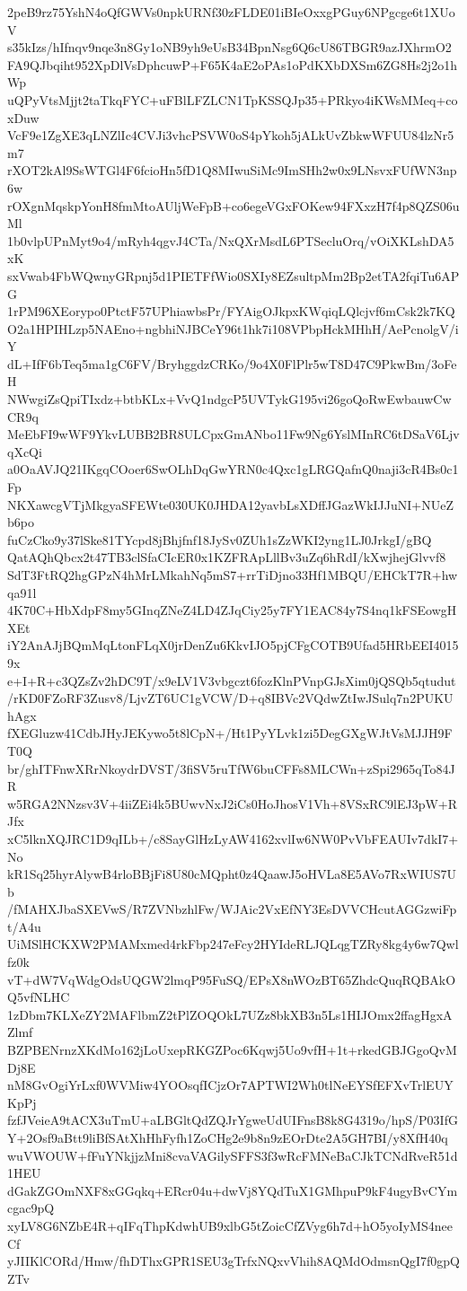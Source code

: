 2peB9rz75YshN4oQfGWVs0npkURNf30zFLDE01iBIeOxxgPGuy6NPgcge6t1XUoV
s35kIzs/hIfnqv9nqe3n8Gy1oNB9yh9eUsB34BpnNsg6Q6cU86TBGR9azJXhrmO2
FA9QJbqiht952XpDlVsDphcuwP+F65K4aE2oPAs1oPdKXbDXSm6ZG8Hs2j2o1hWp
uQPyVtsMjjt2taTkqFYC+uFBlLFZLCN1TpKSSQJp35+PRkyo4iKWsMMeq+coxDuw
VcF9e1ZgXE3qLNZlIc4CVJi3vhcPSVW0oS4pYkoh5jALkUvZbkwWFUU84lzNr5m7
rXOT2kAl9SsWTGl4F6fcioHn5fD1Q8MIwuSiMc9ImSHh2w0x9LNsvxFUfWN3np6w
rOXgnMqskpYonH8fmMtoAUljWeFpB+co6egeVGxFOKew94FXxzH7f4p8QZS06uMl
1b0vlpUPnMyt9o4/mRyh4qgvJ4CTa/NxQXrMsdL6PTSecluOrq/vOiXKLshDA5xK
sxVwab4FbWQwnyGRpnj5d1PIETFfWio0SXIy8EZsultpMm2Bp2etTA2fqiTu6APG
1rPM96XEorypo0PtctF57UPhiawbsPr/FYAigOJkpxKWqiqLQlcjvf6mCsk2k7KQ
O2a1HPIHLzp5NAEno+ngbhiNJBCeY96t1hk7i108VPbpHckMHhH/AePcnolgV/iY
dL+IfF6bTeq5ma1gC6FV/BryhggdzCRKo/9o4X0FlPlr5wT8D47C9PkwBm/3oFeH
NWwgiZsQpiTIxdz+btbKLx+VvQ1ndgcP5UVTykG195vi26goQoRwEwbauwCwCR9q
MeEbFI9wWF9YkvLUBB2BR8ULCpxGmANbo11Fw9Ng6YslMInRC6tDSaV6LjvqXcQi
a0OaAVJQ21IKgqCOoer6SwOLhDqGwYRN0c4Qxc1gLRGQafnQ0naji3cR4Bs0c1Fp
NKXawcgVTjMkgyaSFEWte030UK0JHDA12yavbLsXDffJGazWkIJJuNI+NUeZb6po
fuCzCko9y37lSke81TYcpd8jBhjfnf18JySv0ZUh1sZzWKI2yng1LJ0JrkgI/gBQ
QatAQhQbcx2t47TB3clSfaCIcER0x1KZFRApLllBv3uZq6hRdI/kXwjhejGlvvf8
SdT3FtRQ2hgGPzN4hMrLMkahNq5mS7+rrTiDjno33Hf1MBQU/EHCkT7R+hwqa91l
4K70C+HbXdpF8my5GInqZNeZ4LD4ZJqCiy25y7FY1EAC84y7S4nq1kFSEowgHXEt
iY2AnAJjBQmMqLtonFLqX0jrDenZu6KkvIJO5pjCFgCOTB9Ufad5HRbEEI40159x
e+I+R+c3QZsZv2hDC9T/x9eLV1V3vbgczt6fozKlnPVnpGJsXim0jQSQb5qtudut
/rKD0FZoRF3Zusv8/LjvZT6UC1gVCW/D+q8IBVc2VQdwZtIwJSulq7n2PUKUhAgx
fXEGluzw41CdbJHyJEKywo5t8lCpN+/Ht1PyYLvk1zi5DegGXgWJtVsMJJH9FT0Q
br/ghITFnwXRrNkoydrDVST/3fiSV5ruTfW6buCFFs8MLCWn+zSpi2965qTo84JR
w5RGA2NNzsv3V+4iiZEi4k5BUwvNxJ2iCs0HoJhosV1Vh+8VSxRC9lEJ3pW+RJfx
xC5lknXQJRC1D9qILb+/c8SayGlHzLyAW4162xvlIw6NW0PvVbFEAUIv7dkI7+No
kR1Sq25hyrAlywB4rloBBjFi8U80cMQpht0z4QaawJ5oHVLa8E5AVo7RxWIUS7Ub
/fMAHXJbaSXEVwS/R7ZVNbzhlFw/WJAic2VxEfNY3EsDVVCHcutAGGzwiFpt/A4u
UiMSlHCKXW2PMAMxmed4rkFbp247eFcy2HYIdeRLJQLqgTZRy8kg4y6w7Qwlfz0k
vT+dW7VqWdgOdsUQGW2lmqP95FuSQ/EPsX8nWOzBT65ZhdcQuqRQBAkOQ5vfNLHC
1zDbm7KLXeZY2MAFlbmZ2tPlZOQOkL7UZz8bkXB3n5Ls1HIJOmx2ffagHgxAZlmf
BZPBENrnzXKdMo162jLoUxepRKGZPoc6Kqwj5Uo9vfH+1t+rkedGBJGgoQvMDj8E
nM8GvOgiYrLxf0WVMiw4YOOsqfICjzOr7APTWI2Wh0tlNeEYSfEFXvTrlEUYKpPj
fzfJVeieA9tACX3uTmU+aLBGltQdZQJrYgweUdUIFnsB8k8G4319o/hpS/P03IfG
Y+2Osf9aBtt9liBfSAtXhHhFyfh1ZoCHg2e9b8n9zEOrDte2A5GH7BI/y8XfH40q
wuVWOUW+fFuYNkjjzMni8cvaVAGilySFFS3f3wRcFMNeBaCJkTCNdRveR51d1HEU
dGakZGOmNXF8xGGqkq+ERcr04u+dwVj8YQdTuX1GMhpuP9kF4ugyBvCYmcgac9pQ
xyLV8G6NZbE4R+qIFqThpKdwhUB9xlbG5tZoicCfZVyg6h7d+hO5yoIyMS4neeCf
yJIIKlCORd/Hmw/fhDThxGPR1SEU3gTrfxNQxvVhih8AQMdOdmsnQgI7f0gpQZTv
